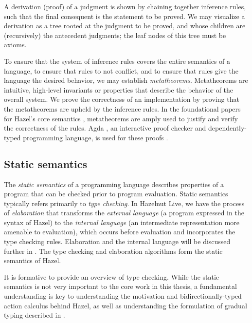A derivation (proof) of a judgment is shown by chaining together inference rules, such that the final consequent is the statement to be proved. We may visualize a derivation as a tree rooted at the judgment to be proved, and whose children are (recursively) the antecedent judgments; the leaf nodes of this tree must be axioms.

To ensure that the system of inference rules covers the entire semantics of a language, to ensure that rules to not conflict, and to ensure that rules give the language the desired behavior, we may establish \textit{metatheorems}. Metatheorems are intuitive, high-level invariants or properties that describe the behavior of the overall system. We prove the correctness of an implementation by proving that the metatheorems are upheld by the inference rules. In the foundational papers for Hazel's core semantics \cite{conf/popl/Hazelnut17,conf/popl/HazelnutLive19}, metatheorems are amply used to justify and verify the correctness of the rules. Agda \cite{bove2009brief}, an interactive proof checker and dependently-typed programming language, is used for these proofs \cite{agda2017,agda-dynamics}.

\subsection{Static semantics}
\label{sec:static-semantics}

The \textit{static semantics} of a programming language describes properties of a program that can be checked prior to program evaluation. Static semantics typically refers primarily to \textit{type checking}. In Hazelnut Live, we have the process of \textit{elaboration} that transforms the \textit{external language} (a program expressed in the syntax of Hazel) to the \textit{internal language} (an intermediate representation more amenable to evaluation), which occurs before evaluation and incorporates the type checking rules. Elaboration and the internal language will be discussed further in . The type checking and elaboration algorithms form the static semantics of Hazel.

It is formative to provide an overview of type checking. While the static semantics is not very important to the core work in this thesis, a fundamental understanding is key to understanding the motivation and bidirectionally-typed action calculus behind Hazel, as well as understanding the formulation of gradual typing described in .

